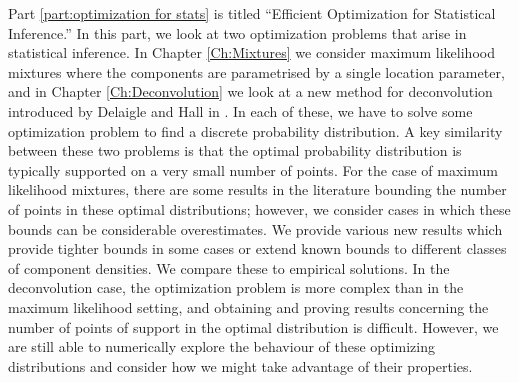 Part \ref{part:optimization for stats} is titled ``Efficient Optimization for Statistical Inference.'' In this part, we look at two optimization problems that arise in statistical inference. In Chapter \ref{Ch:Mixtures} we consider maximum likelihood mixtures where the components are parametrised by a single location parameter, and in Chapter \ref{Ch:Deconvolution} we look at a new method for deconvolution introduced by Delaigle and Hall in \cite{Delaigle2016-la}. In each of these, we have to solve some optimization problem to find a discrete probability distribution. A key similarity between these two problems is that the optimal probability distribution is typically supported on a very small number of points. 
For the case of maximum likelihood mixtures, there are some results in the literature bounding the number of points in these optimal distributions; however, we consider cases in which these bounds can be considerable overestimates. We provide various new results which provide tighter bounds in some cases or extend known bounds to different classes of component densities. We compare these to empirical solutions.
In the deconvolution case, the optimization problem is more complex than in the maximum likelihood setting, and obtaining and proving results concerning the number of points of support in the optimal distribution is difficult. However, we are still able to numerically explore the behaviour of these optimizing distributions and consider how we might take advantage of their properties.
